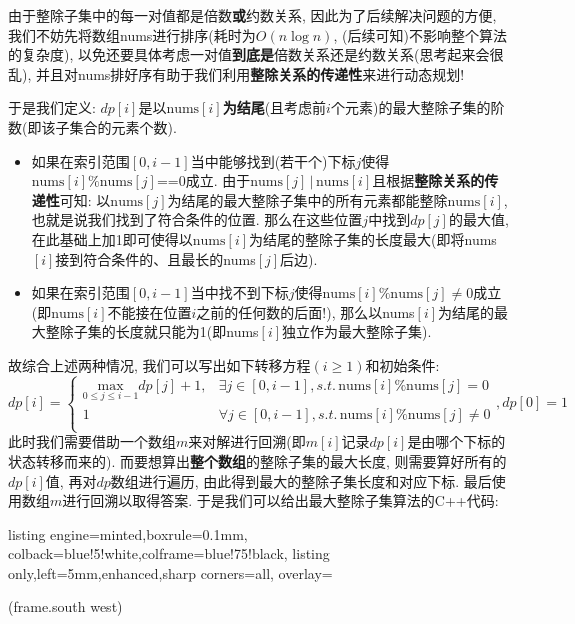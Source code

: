 \documentclass{article}
\begin{document}
\begin{homeworkProblem}
	由于整除子集中的每一对值都是倍数\textbf{或}约数关系, 因此为了后续解决问题的方便, 我们不妨先将数组nums进行排序(耗时为$O(n\log n)$, (后续可知)不影响整个算法的复杂度), 以免还要具体考虑一对值\textbf{到底是}倍数关系还是约数关系(思考起来会很乱), 并且对nums排好序有助于我们利用\textbf{整除关系的传递性}来进行动态规划! 
    
    于是我们定义: $dp[i]$是以$\text{nums}[i]$\textbf{为结尾}(且考虑前$i$个元素)的最大整除子集的阶数(即该子集合的元素个数).
    \begin{itemize}
        \item 如果在索引范围$[0,i-1]$当中能够找到(若干个)下标$j$使得$\text{nums}[i] \% \text{nums}[j]\text{==}0$成立. 由于$\text{nums}[j]\,|\,\text{nums}[i]$且根据\textbf{整除关系的传递性}可知: 以$\text{nums}[j]$为结尾的最大整除子集中的所有元素都能整除$\text{nums}[i]$, 也就是说我们找到了符合条件的位置. 那么在这些位置$j$中找到$dp[j]$的最大值, 在此基础上加1即可使得以$\text{nums}[i]$为结尾的整除子集的长度最大(即将nums$[i]$接到符合条件的、且最长的nums$[j]$后边).
        \item 如果在索引范围$[0,i-1]$当中找不到下标$j$使得$\text{nums}[i] \% \text{nums}[j]\neq 0$成立(即$\text{nums}[i]$不能接在位置$i$之前的任何数的后面!), 那么以nums$[i]$为结尾的最大整除子集的长度就只能为1(即nums$[i]$独立作为最大整除子集).
    \end{itemize}
    故综合上述两种情况, 我们可以写出如下转移方程$(i\geq 1)$和初始条件:
    $$
    dp\left[ i \right] =\left\{ \begin{matrix}
        \underset{0\le j\le i-1}{\text{max}}dp\left[ j \right] +1,&		\exists j\in \left[ 0,i-1 \right] , s.t.\, \text{nums}\left[ i \right] \%\text{nums}\left[ j \right] =0\\
        1&		\forall j\in \left[ 0,i-1 \right] , s.t. \,\text{nums}\left[ i \right] \%\text{nums}\left[ j \right] \ne 0\\
    \end{matrix} \right. , dp\left[ 0 \right] =1
    $$
    此时我们需要借助一个数组$m$来对解进行回溯(即$m[i]$记录$dp[i]$是由哪个下标的状态转移而来的). 而要想算出\textbf{整个数组}的整除子集的最大长度, 则需要算好所有的$dp[i]$值, 再对$dp$数组进行遍历, 由此得到最大的整除子集长度和对应下标. 最后使用数组$m$进行回溯以取得答案. 于是我们可以给出最大整除子集算法的C++代码:
\begin{tcblisting}{listing engine=minted,boxrule=0.1mm,
colback=blue!5!white,colframe=blue!75!black,
listing only,left=5mm,enhanced,sharp corners=all,
overlay={\begin{tcbclipinterior} (frame.south west)

\end{tcbclipinterior}}}
\end{tcblisting}
\end{homeworkProblem}
\end{document}
